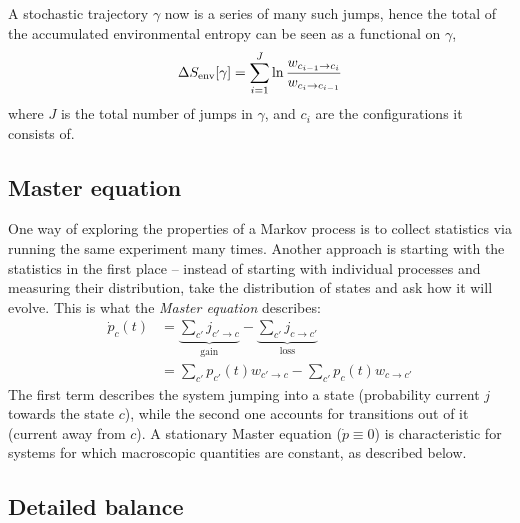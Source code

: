 A stochastic trajectory \(\gamma\) now is a series of many such jumps, hence the total of the accumulated environmental entropy can be seen as a functional on \(\gamma\),
%
\begin{align}
	\label{eqn:SEnv rate jump functional}
	\Delta S_\text{env}[\gamma] = \sum_{i=1}^J\ln\frac{w_{c_{i-1}\to c_i}}{w_{c_i\to c_{i-1}}}
\end{align}
%
where \(J\) is the total number of jumps in \(\gamma\), and \(c_i\) are the configurations it consists of.




\subsection{Master equation}
\label{sec:master equation}

One way of exploring the properties of a Markov process is to collect statistics via running the same experiment many times. Another approach is starting with the statistics in the first place -- instead of starting with individual processes and measuring their distribution, take the distribution of states and ask how it will evolve. This is what the \emph{Master equation} describes:
%
\begin{align}
	\label{eqn:master}
	\dot p_c(t)
		&= \underbrace{\sum_{c'} j_{c'\to c}}_{\text{gain}}
		- \underbrace{\sum_{c'} j_{c\to c'}}_{\text{loss}} \\
		&= \sum_{c'} p_{c'}(t)w_{c'\to c}
		- \sum_{c'} p_c(t)w_{c\to c'}
\end{align}
%
The first term describes the system jumping into a state (probability current \(j\) towards the state \(c\)), while the second one accounts for transitions out of it (current away from \(c\)). A stationary Master equation (\(\dot p \equiv 0\)) is characteristic for systems for which macroscopic quantities are constant, as described below.






\subsection{Detailed balance}
\label{sec:detailed balance}


